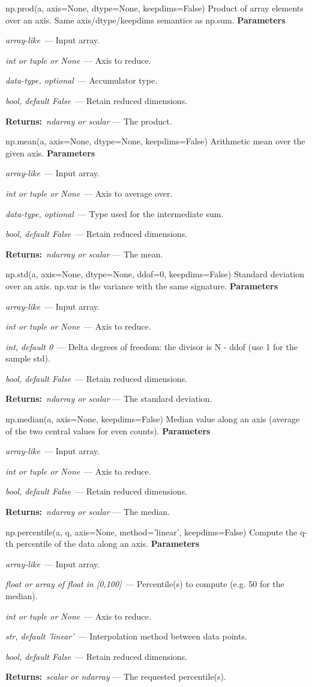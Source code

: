 \documentclass[10pt]{article}
\newenvironment{params}
  {\smallskip\textbf{\small\color{accent}Parameters}\par\nopagebreak
   \begin{description}[leftmargin=1.3em,itemsep=1.5pt,parsep=0pt,topsep=1pt,
      labelindent=0pt,style=sameline,font=\normalfont]}
  {\end{description}}
\newcommand{\pitem}[3]{\item[{\ttfamily\color{accent}#1}]{\itshape #2}\ --- #3}
\newcommand{\preturn}[2]{\smallskip\textbf{\small\color{accent}Returns:}\ {\itshape #1} --- #2\par}
\begin{document}
\begin{func}{np.prod(a, axis=None, dtype=None, keepdims=False)}
Product of array elements over an axis. Same axis/dtype/keepdims semantics as np.sum.
\begin{params}
\pitem{a}{array-like}{Input array.}
\pitem{axis}{int or tuple or None}{Axis to reduce.}
\pitem{dtype}{data-type, optional}{Accumulator type.}
\pitem{keepdims}{bool, default False}{Retain reduced dimensions.}
\end{params}
\preturn{ndarray or scalar}{The product.}
\end{func}
\medskip

\begin{func}{np.mean(a, axis=None, dtype=None, keepdims=False)}
Arithmetic mean over the given axis.
\begin{params}
\pitem{a}{array-like}{Input array.}
\pitem{axis}{int or tuple or None}{Axis to average over.}
\pitem{dtype}{data-type, optional}{Type used for the intermediate sum.}
\pitem{keepdims}{bool, default False}{Retain reduced dimensions.}
\end{params}
\preturn{ndarray or scalar}{The mean.}
\end{func}
\medskip

\begin{func}{np.std(a, axis=None, dtype=None, ddof=0, keepdims=False)}
Standard deviation over an axis. np.var is the variance with the same signature.
\begin{params}
\pitem{a}{array-like}{Input array.}
\pitem{axis}{int or tuple or None}{Axis to reduce.}
\pitem{ddof}{int, default 0}{Delta degrees of freedom: the divisor is N - ddof (use 1 for the sample std).}
\pitem{keepdims}{bool, default False}{Retain reduced dimensions.}
\end{params}
\preturn{ndarray or scalar}{The standard deviation.}
\end{func}
\medskip

\begin{func}{np.median(a, axis=None, keepdims=False)}
Median value along an axis (average of the two central values for even counts).
\begin{params}
\pitem{a}{array-like}{Input array.}
\pitem{axis}{int or tuple or None}{Axis to reduce.}
\pitem{keepdims}{bool, default False}{Retain reduced dimensions.}
\end{params}
\preturn{ndarray or scalar}{The median.}
\end{func}
\medskip

\begin{func}{np.percentile(a, q, axis=None, method='linear', keepdims=False)}
Compute the q-th percentile of the data along an axis.
\begin{params}
\pitem{a}{array-like}{Input array.}
\pitem{q}{float or array of float in [0,100]}{Percentile(s) to compute (e.g. 50 for the median).}
\pitem{axis}{int or tuple or None}{Axis to reduce.}
\pitem{method}{str, default 'linear'}{Interpolation method between data points.}
\pitem{keepdims}{bool, default False}{Retain reduced dimensions.}
\end{params}
\preturn{scalar or ndarray}{The requested percentile(s).}
\end{func}
\medskip
\end{document}

